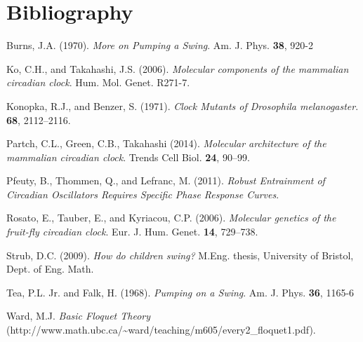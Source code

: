 \documentclass[11pt,letter, english,%
]{article}
\begin{document}
\section*{Bibliography}
\noindent
Burns, J.A. (1970). \textit{More on Pumping a Swing}. Am. J. Phys. \textbf{38}, 920-2

\bigskip\noindent
Ko, C.H., and Takahashi, J.S. (2006). \textit{Molecular components of the
mammalian circadian clock}. Hum. Mol. Genet. R271-7.

\bigskip\noindent
Konopka, R.J., and Benzer, S. (1971). \textit{Clock Mutants of Drosophila
melanogaster}. \textbf{68}, 2112–2116.

\bigskip\noindent
Partch, C.L., Green, C.B., Takahashi (2014).
\textit{Molecular architecture of the mammalian circadian clock}. Trends Cell
Biol. \textbf{24}, 90–99.

\bigskip\noindent
Pfeuty, B., Thommen, Q., and Lefranc, M. (2011). \textit{Robust Entrainment of
Circadian Oscillators Requires Specific Phase Response Curves}.

\bigskip\noindent
Rosato, E., Tauber, E., and Kyriacou, C.P. (2006). \textit{Molecular genetics
of the fruit-fly circadian clock}. Eur. J. Hum. Genet. \textbf{14},
729–738.

\bigskip\noindent
Strub, D.C. (2009). \textit{How do children swing?}  M.Eng. thesis, University
of Bristol, Dept. of Eng. Math.%

\bigskip\noindent
Tea, P.L. Jr. and Falk, H. (1968). \textit{Pumping on a Swing}. Am. J. Phys. 
\textbf{36}, 1165-6

\bigskip\noindent
Ward, M.J. \textit{Basic Floquet Theory}
(http://www.math.ubc.ca/\~{}ward/teaching/m605/every2\_floquet1.pdf).
\end{document}
